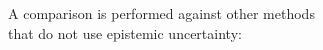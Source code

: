 \documentclass[preview]{standalone}
\begin{document}
\begin{center}
A comparison is performed against other methods \\ 
            that do not use epistemic uncertainty:
\end{center}
\end{document}
